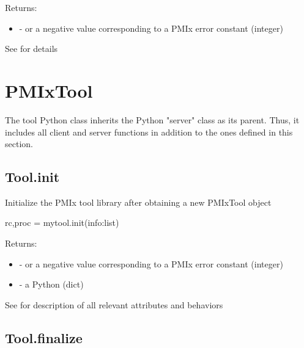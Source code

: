 Returns:

\begin{itemize}
    \item {} -  or a negative value corresponding to a PMIx error constant (integer)
\end{itemize}


See  for details



\section{PMIxTool}
\label{app:python:tool}

The tool Python class inherits the Python "server" class as its parent. Thus, it includes all client and server functions in addition to the ones defined in this section.

\subsection{Tool.init}

\summary Initialize the \ac{PMIx} tool library after obtaining a new PMIxTool object

\format

\pyspecificstart
\begin{codepar}
rc,proc = mytool.init(info:list)
\end{codepar}
\pyspecificend


\begin{arglist}
\end{arglist}

Returns:

\begin{itemize}
    \item {} -  or a negative value corresponding to a PMIx error constant (integer)
    \item {} - a Python  (dict)
\end{itemize}


See  for description of all relevant attributes and behaviors


\subsection{Tool.finalize}

